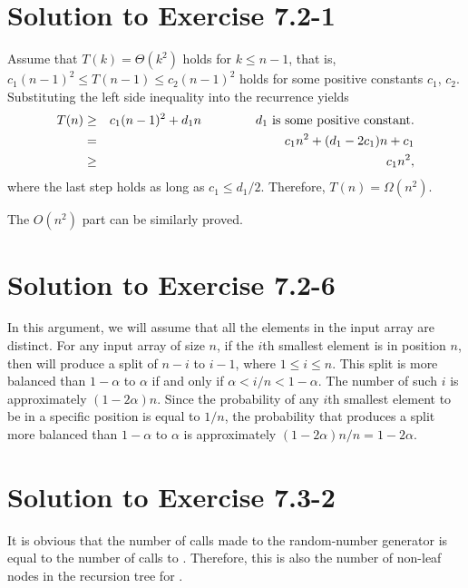 \documentclass[a4paper, fleqn]{article}
\begin{document}
\section*{Solution to Exercise 7.2-1}
Assume that $T(k) = \Theta(k^2)$ holds for $k \leq n-1$, that is, $c_1 (n-1)^2 
\leq T(n-1) \leq c_2 (n-1)^2$ holds for some positive constants $c_1$, $c_2$. 
Substituting the left side inequality into the recurrence yields
\begin{eqnarray*}
T(n) & \geq & c_1 (n-1)^2 + d_1 n \hspace{15mm} d_1 \mbox{ is some positive constant.} \\
     &   =  & c_1 n^2 + (d_1 - 2c_1)n + c_1 \\
     & \geq & c_1 n^2,
\end{eqnarray*}
where the last step holds as long as $c_1 \leq d_1 / 2$. Therefore, $T(n) = \Omega(n^2)$.

The $O(n^2)$ part can be similarly proved.







\section*{Solution to Exercise 7.2-6}
In this argument, we will assume that all the elements in the input array are 
distinct. For any input array of size $n$, if the $i$th smallest element is in 
position $n$, then  will produce a split of $n-i$ to $i-1$, 
where $1 \leq i \leq n$. This split is more balanced than $1 - \alpha$ to 
$\alpha$ if and only if $\alpha < i/n < 1 - \alpha$. The number of such $i$ is 
approximately $(1-2\alpha)n$. Since the probability of any $i$th smallest 
element to be in a specific position is equal to $1/n$, the probability that 
 produces a split more balanced than $1-\alpha$ to $\alpha$ is 
approximately $(1-2\alpha)n/n = 1-2\alpha$.







\section*{Solution to Exercise 7.3-2}
It is obvious that the number of calls made to the random-number generator 
 is equal to the number of calls to . 
Therefore, this is also the number of non-leaf nodes in the recursion tree 
for .
\end{document}
